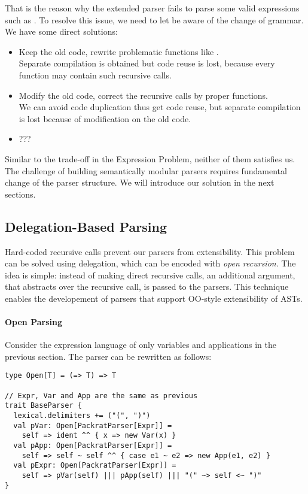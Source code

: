 That is the reason why the extended parser fails to parse some valid expressions such as  . To resolve this issue, we need to let  be aware of the change of grammar. We have some direct solutions:

\begin{itemize}
    \item Keep the old code, rewrite problematic functions like . \\Separate compilation is obtained but code reuse is lost, because every function may contain such recursive calls.
    \item Modify the old code, correct the recursive calls by proper functions. \\We can avoid code duplication thus get code reuse, but separate compilation is lost because of modification on the old code.
    \item ??? 
\end{itemize}

Similar to the trade-off in the Expression Problem, neither of them satisfies us. The challenge of building semantically modular parsers requires fundamental change of the parser structure. We will introduce our solution in the next sections.

\subsection{Delegation-Based Parsing}\label{subsec:overview-firstlook}

Hard-coded recursive calls prevent our parsers from extensibility.
This problem can be solved using delegation, which can be encoded with \textit{open recursion}. The idea is
simple: instead of making direct recursive calls, an additional
argument, that abstracts over the recursive call, is passed to the
parsers. This technique enables the developement of parsers that
support OO-style extensibility of ASTs.

\paragraph{Open Parsing} Consider the expression language of only variables and applications in the previous section. The parser can be rewritten as follows:

\begin{lstlisting}
type Open[T] = (=> T) => T

// Expr, Var and App are the same as previous
trait BaseParser {
  lexical.delimiters += ("(", ")")
  val pVar: Open[PackratParser[Expr]] =
    self => ident ^^ { x => new Var(x) }
  val pApp: Open[PackratParser[Expr]] =
    self => self ~ self ^^ { case e1 ~ e2 => new App(e1, e2) }
  val pExpr: Open[PackratParser[Expr]] =
    self => pVar(self) ||| pApp(self) ||| "(" ~> self <~ ")"
}
\end{lstlisting}

